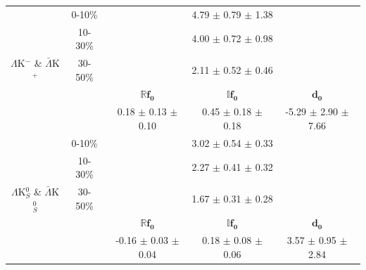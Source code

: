 \documentclass[../AnalysisNoteJBuxton.tex]{subfiles}
\begin{document}
\begin{landscape}
\begin{table}[htbp]
{\begin{tabular}{|c|c|c|c|c|}
  \hline
  \hline
  
  \multirow{5}{*}{$\Lambda$K$^{-}$ \& $\bar{\Lambda}$K$^{+}$}  
  &  0-10\% & \multicolumn{3}{c|}{4.79 $\pm$ 0.79 $\pm$ 1.38} \\  %
  & 10-30\% & \multicolumn{3}{c|}{4.00 $\pm$ 0.72 $\pm$ 0.98} \\  %
  & 30-50\% & \multicolumn{3}{c|}{2.11 $\pm$ 0.52 $\pm$ 0.46} \\  %
  \cline{2-5}
  & & $\mathbf{\mathbb{R}f_{0}}$ & $\mathbf{\mathbb{I}f_{0}}$ & $\mathbf{d_{0}}$ \\
  \cline{3-5}     
  & & 0.18 $\pm$ 0.13 $\pm$ 0.10 & 0.45 $\pm$ 0.18 $\pm$ 0.18 & -5.29 $\pm$ 2.90 $\pm$ 7.66 \\
   
  \hline
  \hline  
  
  \multirow{5}{*}{$\Lambda$K$^{0}_{S}$ \& $\bar{\Lambda}$K$^{0}_{S}$}  
   &  0-10\% & \multicolumn{3}{c|}{3.02 $\pm$ 0.54 $\pm$ 0.33} \\  %
   & 10-30\% & \multicolumn{3}{c|}{2.27 $\pm$ 0.41 $\pm$ 0.32} \\  %
   & 30-50\% & \multicolumn{3}{c|}{1.67 $\pm$ 0.31 $\pm$ 0.28} \\  %
   \cline{2-5}   
   & & $\mathbf{\mathbb{R}f_{0}}$ & $\mathbf{\mathbb{I}f_{0}}$ & $\mathbf{d_{0}}$ \\
   \cline{3-5} 
   & & -0.16 $\pm$ 0.03 $\pm$ 0.04 & 0.18 $\pm$ 0.08 $\pm$ 0.06 & 3.57 $\pm$ 0.95 $\pm$ 2.84 \\
  \hline
 \end{tabular}}
 \label{tab:FitResultsLamKchandLamK0QM2}
\end{table}


\clearpage
\begin{table}[htbp]
 \centering
\end{table}
\end{landscape}
\end{document}
